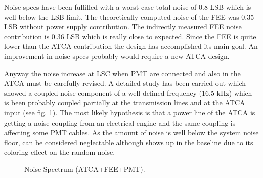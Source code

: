 \documentclass[a4paper,11pt]{report}
\begin{document}
Noise specs have been fulfilled with a worst case total noise of 0.8 LSB which is well below the LSB limit. The theoretically computed noise of the FEE was 0.35 LSB without power supply contribution. The indirectly measured FEE noise contribution is 0.36 LSB which is really close to expected. Since the FEE is quite lower than the ATCA contribution the design has accomplished its main goal. An improvement in noise specs probably would require a new ATCA design.
\par Anyway the noise increase at LSC when PMT are connected and also in the ATCA must be carefully revised. A detailed study has been carried out which showed a coupled noise component of a well defined frequency (16.5 kHz) which is been probably coupled partially at the transmission lines and at the ATCA input (see fig. \ref{fig:noise}). The most likely hypothesis is that a power line of the ATCA is getting a noise coupling from an electrical engine and the same coupling is affecting some PMT cables. As the amount of noise is well below the system noise floor, can be considered neglectable although shows up in the baseline due to its coloring effect on the random noise.



\begin{figure}[!tbp]
  \centering
  \hfill
  \caption{Noise Spectrum (ATCA+FEE+PMT).}
  \label{fig:noise}
\end{figure}
\end{document}

